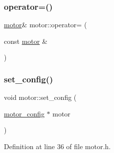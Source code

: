 \mbox{\label{classmotor_aaca163743034455779d02fd44e1c090e}} 
\subsubsection{\texorpdfstring{operator=()}{operator=()}\hspace{0.1cm}{\footnotesize\ttfamily [2/2]}}
{\footnotesize\ttfamily \mbox{\hyperlink{classmotor}{motor}}\& motor\+::operator= (\begin{DoxyParamCaption}\item[{const \mbox{\hyperlink{classmotor}{motor}} \&}]{ }\end{DoxyParamCaption})\hspace{0.3cm}{\ttfamily [default]}}

\mbox{\label{classmotor_a4580801b17e4b05384ab89ece8c3ca12}} 
\subsubsection{\texorpdfstring{set\_config()}{set\_config()}}
{\footnotesize\ttfamily void motor\+::set\+\_\+config (\begin{DoxyParamCaption}\item[{\mbox{\hyperlink{structmotor__config}{motor\+\_\+config}} $\ast$}]{motor }\end{DoxyParamCaption})\hspace{0.3cm}{\ttfamily [inline]}}



Definition at line 36 of file motor.\+h.

